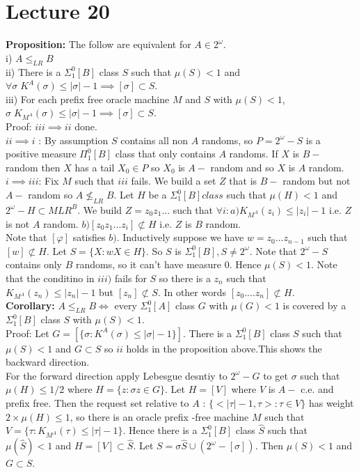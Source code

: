 \documentclass{article}
\begin{document}
      \section{Lecture 20}
      \textbf{Proposition:} The follow are equivalent for $A \in 2^\omega$.\\
      i) $A \leq_{LR}B$\\
      ii) There is a $\Sigma^0_1[B]$ class $S$ such that $\mu(S) < 1$ and $\forall \sigma \; K^A(\sigma) \leq |\sigma | - 1 \implies [\sigma] \subset S$.\\
      iii) For each prefix free oracle machine $M$ and $S$ with $\mu(S) <1$, $ \sigma \; K_{M^A}(\sigma) \leq |\sigma | - 1 \implies [\sigma] \subset S$.\\
      Proof: $iii \implies ii$ done.\\
      $ii \implies i$ : By assumption $S$ contains all non $A$ randoms, so $P = 2^\omega - S$ is a positive measure $\Pi^0_1[B]$ class that only contains $A$ randoms. If $X$ is $B-$ random then $X$ has a tail $X_0\in P$ so $X_0$ is $A-$ random and so $X$ is $A$ random.\\
      $i\implies iii$: Fix $M$ such that $iii$ fails. We build a set $Z$ that is $B-$ random but not $A-$ random so $A \not \leq_{LR}B$. Let $H$ be a $\Sigma^0_1[B] class$ such that $\mu(H)< 1$ and $2^\omega - H \subset MLR^B$. We build $Z = z_0 z_1...$ such that $\forall i : a) K_{M^A}(z_i) \leq |z_i| - 1$ i.e. $Z$ is not $A$ random. $b) [ z_0 z_1...z_i] \not \subset H$ i.e. $Z$ is $B$ random.\\
      Note that $[\varphi]$ satisfies $b)$. Inductively suppose we have $w = z_0...z_{n-1} $ such that $[w] \not \subset H$. Let $S = \{X : wX \in H\}$. So $S$ is $\Sigma^0_1[B], S \neq 2^\omega$. Note that $2^\omega - S$ contains only $B$ randoms, so it can't have measure $0$. Hence $\mu(S) < 1$. Note that the conditino in $iii)$ fails for $S$ so there is a $z_n$ such that $K_{M^A}(z_n) \leq |z_n| - 1$ but $[z_n] \not \subset S$. In other words $[z_0....z_n] \not \subset H$.\\
      \textbf{Corollary:} $A \leq_{LR} B \iff $ every $\Sigma^0_1[A]$ class $G$ with $\mu(G) < 1$ is covered by a $\Sigma^0_1[B]$ class  $S$ with $\mu(S) < 1$.\\
      Proof: Let $G = [\{\sigma: K^A(\sigma) \leq |\sigma| - 1\}]$. There is a $\Sigma^0_1[B]$ class $S$ such that $\mu(S) < 1$ and $G \subset S$ so $ii$ holds in the proposition above.This shows the backward direction.\\
      For the forward  direction apply Lebesgue desntiy to $2^\omega - G$ to get $\sigma$ such that $\mu(H) \leq 1/2$ where $H = \{z : \sigma z \in G\}$. Let $H = [V]$ where $V$ is $A-$ c.e. and prefix free. Then the request set relative to $A$ : $\{<|\tau| - 1, \tau> : \tau \in V\}$ has weight $2 \times \mu(H) \leq 1$, so there is an oracle prefix -free machine $M$ such that $V = \{\tau: K_{M^A}(\tau) \leq |\tau| - 1\}$.  Hence there is a $\Sigma^0_1[B]$ class $\hat S$ such that $\mu(\hat S) < 1$ and $H = [V] \subset \hat S$. Let $S = \sigma \hat S \cup (2^\omega - [\sigma])$. Then $\mu(S) < 1$ and $G\subset S$.\\\\
\end{document}
